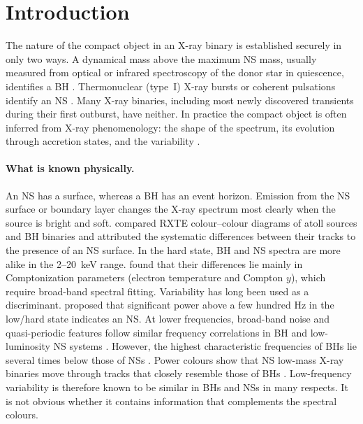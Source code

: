 \documentclass[11pt,a4paper]{article}
\begin{document}
\section{Introduction}\label{sec:intro}

The nature of the compact object in an X-ray binary is established securely in only two ways. A dynamical mass above the
maximum NS mass, usually measured from optical or infrared spectroscopy of the donor star in quiescence, identifies a
BH \citep{CorralSantana2016,Marcel2026}. Thermonuclear (type~I) X-ray bursts or coherent pulsations identify an NS
\citep{Galloway2008,Galloway2020}. Many X-ray binaries, including most newly discovered transients during their first
outburst, have neither. In practice the compact object is often inferred from X-ray phenomenology: the shape of the
spectrum, its evolution through accretion states, and the variability
\citep{RemillardMcClintock2006}.

\paragraph{What is known physically.}
An NS has a surface, whereas a BH has an event horizon. Emission from the NS surface or boundary layer changes the X-ray
spectrum most clearly when the source is bright and soft. \citet{DoneGierlinski2003} compared RXTE colour--colour diagrams
of atoll sources and BH binaries and attributed the systematic differences between their tracks to the presence of an NS
surface. In the hard state, BH and NS spectra are more alike in the 2--20~keV range. \citet{Burke2017} found that their
differences lie mainly in Comptonization parameters (electron temperature and Compton $y$), which require broad-band
spectral fitting. Variability has long been used as a discriminant. \citet{SunyaevRevnivtsev2000} proposed that significant
power above a few hundred Hz in the low/hard state indicates an NS. At lower frequencies, broad-band noise and
quasi-periodic features follow similar frequency correlations in BH and low-luminosity NS systems
\citep{WijnandsvanderKlis1999}. However, the highest characteristic frequencies of BHs lie several times below those of
NSs \citep{KleinWolt2008}. Power colours show that NS low-mass X-ray binaries move through tracks that closely resemble
those of BHs \citep{Heil2015,GardenierUttley2018}. Low-frequency variability is therefore known to be similar in BHs and
NSs in many respects. It is not obvious whether it contains information that complements the spectral colours.
\end{document}
